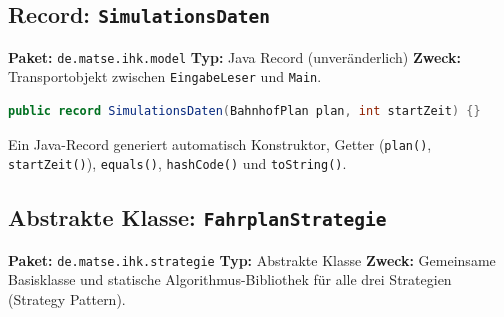 \documentclass[12pt,a4paper]{article}
\begin{document}
\subsection{Record: \texttt{SimulationsDaten}}

\textbf{Paket:} \texttt{de.matse.ihk.model} \quad
\textbf{Typ:} Java Record (unveränderlich) \quad
\textbf{Zweck:} Transportobjekt zwischen \texttt{EingabeLeser} und \texttt{Main}.

\begin{lstlisting}[language=Java]
public record SimulationsDaten(BahnhofPlan plan, int startZeit) {}
\end{lstlisting}

Ein Java-Record generiert automatisch Konstruktor, Getter (\texttt{plan()},
\texttt{startZeit()}), \texttt{equals()}, \texttt{hashCode()} und \texttt{toString()}.

\subsection{Abstrakte Klasse: \texttt{FahrplanStrategie}}

\textbf{Paket:} \texttt{de.matse.ihk.strategie} \quad
\textbf{Typ:} Abstrakte Klasse \quad
\textbf{Zweck:} Gemeinsame Basisklasse und statische Algorithmus-Bibliothek
für alle drei Strategien (Strategy Pattern).
\end{document}
